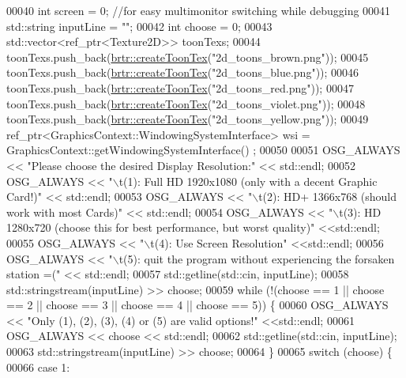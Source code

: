 \begin{DoxyCode}
00040     \textcolor{keywordtype}{int} screen = 0;  \textcolor{comment}{//for easy multimonitor switching while debugging}
00041     std::string inputLine = \textcolor{stringliteral}{""};
00042     \textcolor{keywordtype}{int} choose = 0;
00043     std::vector<ref\_ptr<Texture2D>> toonTexs;
00044     toonTexs.push\_back(\hyperlink{namespacebrtr_aea7b3b188858f0bce09f2450a749f497}{brtr::createToonTex}(\textcolor{stringliteral}{"2d\_toons\_brown.png"}));
00045     toonTexs.push\_back(\hyperlink{namespacebrtr_aea7b3b188858f0bce09f2450a749f497}{brtr::createToonTex}(\textcolor{stringliteral}{"2d\_toons\_blue.png"}));
00046     toonTexs.push\_back(\hyperlink{namespacebrtr_aea7b3b188858f0bce09f2450a749f497}{brtr::createToonTex}(\textcolor{stringliteral}{"2d\_toons\_red.png"}));
00047     toonTexs.push\_back(\hyperlink{namespacebrtr_aea7b3b188858f0bce09f2450a749f497}{brtr::createToonTex}(\textcolor{stringliteral}{"2d\_toons\_violet.png"}));
00048     toonTexs.push\_back(\hyperlink{namespacebrtr_aea7b3b188858f0bce09f2450a749f497}{brtr::createToonTex}(\textcolor{stringliteral}{"2d\_toons\_yellow.png"}));
00049     ref\_ptr<GraphicsContext::WindowingSystemInterface> wsi = GraphicsContext::getWindowingSystemInterface()
      ;
00050 
00051     OSG\_ALWAYS << \textcolor{stringliteral}{"Please choose the desired Display Resolution:"} << std::endl;
00052     OSG\_ALWAYS << \textcolor{stringliteral}{"\(\backslash\)t(1): Full HD 1920x1080 (only with a decent Graphic Card!)"} << std::endl;
00053     OSG\_ALWAYS << \textcolor{stringliteral}{"\(\backslash\)t(2): HD+ 1366x768 (should work with most Cards)"} << std::endl;
00054     OSG\_ALWAYS << \textcolor{stringliteral}{"\(\backslash\)t(3): HD 1280x720 (choose this for best performance, but worst quality)"} <<std::endl;
00055     OSG\_ALWAYS << \textcolor{stringliteral}{"\(\backslash\)t(4): Use Screen Resolution"} <<std::endl; 
00056     OSG\_ALWAYS << \textcolor{stringliteral}{"\(\backslash\)t(5): quit the program without experiencing the forsaken station =("} << std::endl;
00057     std::getline(std::cin, inputLine);
00058     std::stringstream(inputLine) >> choose;
00059     \textcolor{keywordflow}{while} (!(choose == 1 || choose == 2 || choose == 3 || choose == 4 || choose == 5)) \{
00060         OSG\_ALWAYS << \textcolor{stringliteral}{"Only (1), (2), (3), (4) or (5) are valid options!"} <<std::endl;
00061         OSG\_ALWAYS << choose << std::endl;
00062         std::getline(std::cin, inputLine);
00063         std::stringstream(inputLine) >> choose;
00064     \} 
00065     \textcolor{keywordflow}{switch} (choose) \{
00066     \textcolor{keywordflow}{case} 1:

\end{DoxyCode}
